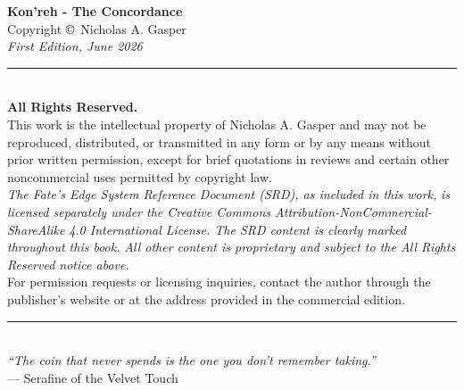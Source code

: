 \cleardoublepage
\thispagestyle{empty}
\begin{center}
  \vspace*{2in}
  {\LARGE\textbf{Kon'reh - The Concordance}}\\[0.3in]
  Copyright \copyright\ Nicholas A. Gasper\\[0.2in]
  \textit{First Edition, June 2026}\\[0.2in]

  \rule{0.6\textwidth}{0.4pt}\\[0.3in]

  \textbf{All Rights Reserved.}\\[0.1in]
  This work is the intellectual property of Nicholas A. Gasper and may not be reproduced,
  distributed, or transmitted in any form or by any means without prior written permission,
  except for brief quotations in reviews and certain other noncommercial uses permitted
  by copyright law.\\[0.2in]

  \textit{The Fate's Edge System Reference Document (SRD), as included in this work,}
  \textit{is licensed separately under the Creative Commons Attribution-NonCommercial-ShareAlike}
  \textit{4.0 International License. The SRD content is clearly marked throughout this book.}
  \textit{All other content is proprietary and subject to the All Rights Reserved notice above.}\\[0.2in]

  For permission requests or licensing inquiries, contact the author through the
  publisher's website or at the address provided in the commercial edition.\\[0.3in]

  \rule{0.5\textwidth}{0.4pt}\\[0.2in]
  \textit{``The coin that never spends is the one you don't remember taking.''}\\[0.1in]
  --- Serafine of the Velvet Touch
\end{center}
\newpage
\cleardoublepage
\thispagestyle{empty}
